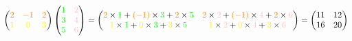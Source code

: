 \documentclass{book}
\begin{document}
\begin{Exemple}
$\begin{pmatrix}
\color{orange}2 &\color{orange}-1 & \color{orange}2 \\
\color{yellow}1 &\color{yellow}0 & \color{yellow}3 \\
\end{pmatrix}\begin{pmatrix}
\color{green}1 & \color{pink}2  \\
\color{green}3 &\color{pink}4 \\
\color{green}5&\color{pink}6\\
\end{pmatrix}=\begin{pmatrix}
\color{orange}2\color{black}\times \color{green} 1\color{black}+\color{orange}(-1)\color{black}\times \color{green} 3 \color{black}+\color{orange}2\color{black}\times \color{green} 5&
\color{orange}2\color{black}\times \color{pink}2\color{black}+\color{orange}(-1)\color{black}\times \color{pink}4 \color{black}+\color{orange}2\color{black}\times \color{pink} 6  \\
\color{yellow}1\color{black}\times \color{green} 1\color{black}+\color{yellow}0\color{black}\times \color{green} 3 \color{black}+\color{yellow}3\color{black}\times \color{green} 5&
\color{yellow}1\color{black}\times \color{pink}2\color{black}+\color{yellow}0\color{black}\times \color{pink}4 \color{black}+\color{yellow}3\color{black}\times \color{pink} 6  \\
\end{pmatrix}=\begin{pmatrix}
11 &12\\
16 &20\\
\end{pmatrix}$
\end{Exemple}
\end{document}
